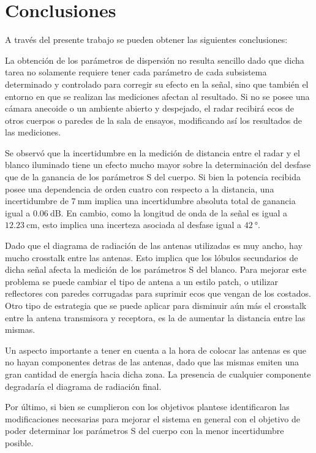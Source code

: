 \chapter{Conclusiones} \label{ch:conclusions}

\ifpdf
    \graphicspath{{Chapter6/Figs/Raster/}{Chapter6/Figs/PDF/}{Chapter6/Figs/}}
\else
    \graphicspath{{Chapter6/Figs/Vector/}{Chapter6/Figs/}}
\fi


A través del presente trabajo se pueden obtener las siguientes conclusiones:

La obtención de los parámetros de dispersión no resulta sencillo dado que dicha tarea no solamente requiere tener cada parámetro de cada subsistema determinado y controlado para corregir su efecto en la señal, sino que también el entorno en que se realizan las mediciones afectan al resultado. Si no se posee una cámara anecoide o un ambiente abierto y despejado, el radar recibirá ecos de otros cuerpos o paredes de la sala de ensayos, modificando así los resultados de las mediciones.

Se observó que la incertidumbre en la medición de distancia entre el radar y el blanco iluminado tiene un efecto mucho mayor sobre la determinación del desfase que de la ganancia de los parámetros S del cuerpo. Si bien la potencia recibida posee una dependencia de orden cuatro con respecto a la distancia, una incertidumbre de $\SI{7}{\milli\meter}$ implica una incertidumbre absoluta total de ganancia igual a $\SI{0.06}{\dB}$. En cambio, como la longitud de onda de la señal es igual a $\SI{12.23}{\centi\meter}$, esto implica una incerteza asociada al desfase igual a $\SI{42}{\degree}$.

Dado que el diagrama de radiación de las antenas utilizadas es muy ancho, hay mucho crosstalk entre las antenas. Esto implica que los lóbulos secundarios de dicha señal afecta la medición de los parámetros S del blanco. Para mejorar este problema se puede cambiar el tipo de antena a un estilo patch, o utilizar reflectores con paredes corrugadas para suprimir ecos que vengan de los costados. Otro tipo de estrategia que se puede aplicar para disminuir aún más el crosstalk entre la antena transmisora y receptora, es la de aumentar la distancia entre las mismas.

Un aspecto importante a tener en cuenta a la hora de colocar las antenas es que no hayan componentes detras de las antenas, dado que las mismas emiten una gran cantidad de energía hacia dicha zona. La presencia de cualquier componente degradaría el diagrama de radiación final.

Por último, si bien se cumplieron con los objetivos plantese identificaron las modificaciones necesarias para mejorar el sistema en general con el objetivo de poder determinar los parámetros S del cuerpo con la menor incertidumbre posible.
